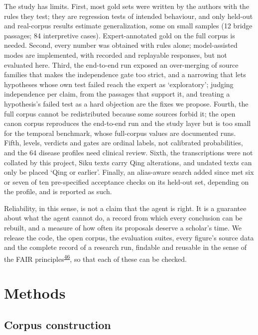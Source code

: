 \documentclass[
]{article}
\begin{document}
The study has limits. First, most gold sets were written by the authors
with the rules they test; they are regression tests of intended
behaviour, and only held-out and real-corpus results estimate
generalization, some on small samples (12 bridge passages; 84
interpretive cases). Expert-annotated gold on the full corpus is needed.
Second, every number was obtained with rules alone; model-assisted modes
are implemented, with recorded and replayable responses, but not
evaluated here. Third, the end-to-end run exposed an over-merging of
source families that makes the independence gate too strict, and a
narrowing that lets hypotheses whose own test failed reach the expert as
`exploratory'; judging independence per claim, from the passages that
support it, and treating a hypothesis's failed test as a hard objection
are the fixes we propose. Fourth, the full corpus cannot be
redistributed because some sources forbid it; the open canon corpus
reproduces the end-to-end run and the study layer but is too small for
the temporal benchmark, whose full-corpus values are documented runs.
Fifth, levels, verdicts and gates are ordinal labels, not calibrated
probabilities, and the 64 disease profiles need clinical review. Sixth,
the transcriptions were not collated by this project, Siku texts carry
Qing alterations, and undated texts can only be placed `Qing or
earlier'. Finally, an alias-aware search added since met six or seven of
ten pre-specified acceptance checks on its held-out set, depending on
the profile, and is reported as such.

Reliability, in this sense, is not a claim that the agent is right. It
is a guarantee about what the agent cannot do, a record from which every
conclusion can be rebuilt, and a measure of how often its proposals
deserve a scholar's time. We release the code, the open corpus, the
evaluation suites, every figure's source data and the complete record of
a research run, findable and reusable in the sense of the FAIR
principles\textsuperscript{\protect\hyperlink{ref-wilkinson2016fair}{46}},
so that each of these can be checked.

\hypertarget{methods}{%
\section{Methods}\label{methods}}

\hypertarget{corpus-construction}{%
\subsection{Corpus construction}\label{corpus-construction}}
\end{document}
